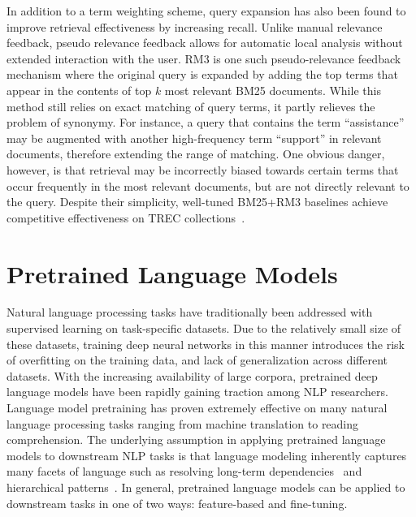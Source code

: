 In addition to a term weighting scheme, query expansion has also been found to improve retrieval effectiveness by increasing recall.
Unlike manual relevance feedback, pseudo relevance feedback allows for automatic local analysis without extended interaction with the user.
RM3 is one such pseudo-relevance feedback mechanism where the original query is expanded by adding the top terms that appear in the contents of top $ k $ most relevant BM25 documents.
While this method still relies on exact matching of query terms, it partly relieves the problem of synonymy.
For instance, a query that contains the term ``assistance'' may be augmented with another high-frequency term ``support'' in relevant documents, therefore extending the range of matching.
One obvious danger, however, is that retrieval may be incorrectly biased towards certain terms that occur frequently in the most relevant documents, but are not directly relevant to the query.
Despite their simplicity, well-tuned BM25+RM3 baselines achieve competitive effectiveness on TREC collections~\cite{lin2019neural}.


\section{Pretrained Language Models}
\label{lm}

Natural language processing tasks have traditionally been addressed with supervised learning on task-specific datasets.
Due to the relatively small size of these datasets, training deep neural networks in this manner introduces the risk of overfitting on the training data, and lack of generalization across different datasets.
With the increasing availability of large corpora, pretrained deep language models have been rapidly gaining traction among NLP researchers.
Language model pretraining has proven extremely effective on many natural language processing tasks ranging from machine translation to reading comprehension.
The underlying assumption in applying pretrained language models to downstream NLP tasks is that language modeling inherently captures many facets of language such as resolving long-term dependencies~\cite{DBLP:journals/corr/LinzenDG16} and hierarchical patterns~\cite{DBLP:journals/corr/abs-1803-11138}.
In general, pretrained language models can be applied to downstream tasks in one of two ways: feature-based and fine-tuning.

